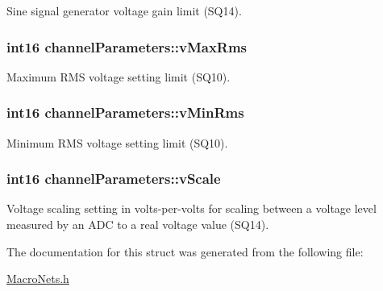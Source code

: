 Sine signal generator voltage gain limit (S\-Q14). \hypertarget{structchannel_parameters_a21e56dc9f903bbea9c980648a8ffc097}{
\subsubsection[{v\-Max\-Rms}]{\setlength{\rightskip}{0pt plus 5cm}int16 channel\-Parameters\-::v\-Max\-Rms}}\label{structchannel_parameters_a21e56dc9f903bbea9c980648a8ffc097}
Maximum R\-M\-S voltage setting limit (S\-Q10). \hypertarget{structchannel_parameters_af6a4d30899a436a77b24b99baa2852f6}{
\subsubsection[{v\-Min\-Rms}]{\setlength{\rightskip}{0pt plus 5cm}int16 channel\-Parameters\-::v\-Min\-Rms}}\label{structchannel_parameters_af6a4d30899a436a77b24b99baa2852f6}
Minimum R\-M\-S voltage setting limit (S\-Q10). \hypertarget{structchannel_parameters_a7bdcae99eedfaaa8bfda6088cec1c08d}{
\subsubsection[{v\-Scale}]{\setlength{\rightskip}{0pt plus 5cm}int16 channel\-Parameters\-::v\-Scale}}\label{structchannel_parameters_a7bdcae99eedfaaa8bfda6088cec1c08d}
Voltage scaling setting in volts-\/per-\/volts for scaling between a voltage level measured by an A\-D\-C to a real voltage value (S\-Q14). 

The documentation for this struct was generated from the following file\-:\begin{DoxyCompactItemize}
\item 
\hyperlink{_macro_nets_8h}{Macro\-Nets.\-h}\end{DoxyCompactItemize}
